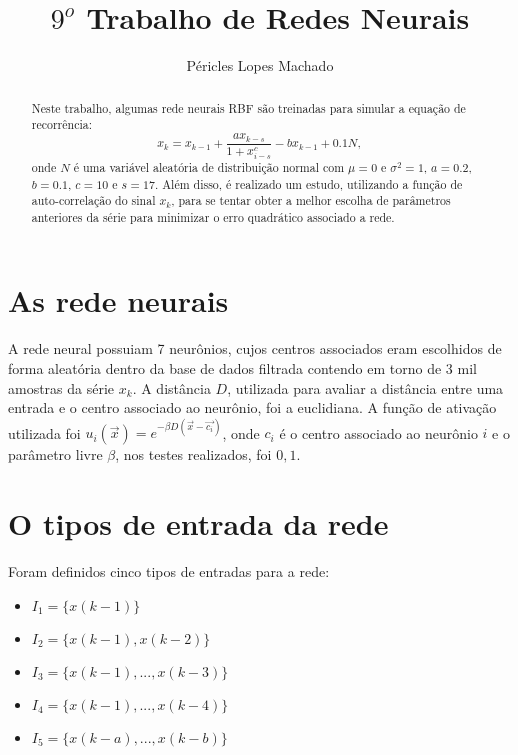 \documentclass[10pt,journal,letterpaper,compsoc]{IEEEtran}
\title{$9^o$ Trabalho de Redes Neurais}
\author{Péricles Lopes Machado}
\newcommand{\fra}[2]{
	\displaystyle \frac{{#1}}{{#2}} 
}
\begin{document}
\maketitle

\begin{abstract}

Neste trabalho, algumas rede neurais RBF são treinadas para simular a equação de recorrência:
\begin{equation}
x_k = x_{k-1} + \fra{a x_{k-s} } { 1 + x_{i-s} ^ c} - b x_{k-1} + 0.1 N ,
\label{eq.1}
\end{equation}
onde $N$ é uma variável aleatória
de distribuição normal com $\mu = 0$ e $\sigma^2 = 1$, $a = 0.2$,
$b = 0.1$, $c = 10$ e $s = 17$. Além disso, é realizado um estudo, utilizando
a função de auto-correlação do sinal $x_k$,
para se tentar obter a melhor escolha
de parâmetros anteriores da série para minimizar o erro quadrático associado a rede.

\end{abstract}

\section{As rede neurais}

A rede neural possuiam 7 neurônios, cujos centros associados eram escolhidos de forma aleatória
dentro da base de dados filtrada contendo em torno de 3 mil amostras da série $x_k$. A distância $D$,
utilizada para avaliar a distância entre uma entrada e o centro associado ao neurônio, foi a euclidiana.
A função de ativação utilizada foi $u_i(\vec{x}) =  e^{-\beta  D(\vec{x} - \vec{c_i})}$, onde $c_i$ é
o centro associado ao neurônio $i$ e o parâmetro livre $\beta$, nos testes realizados, foi $0,1$.

\section{O tipos de entrada da rede}
Foram definidos cinco tipos de entradas para a rede:

\begin{itemize}
\item $I_1 = \{x(k-1)\}$
\item $I_2 = \{x(k-1), x(k-2)\}$
\item $I_3 = \{x(k-1), ... , x(k-3)\}$
\item $I_4 = \{x(k-1), ... , x(k-4)\}$
\item $I_5 = \{x(k-a), ... , x(k-b)\}$
\end{itemize}
\end{document}
